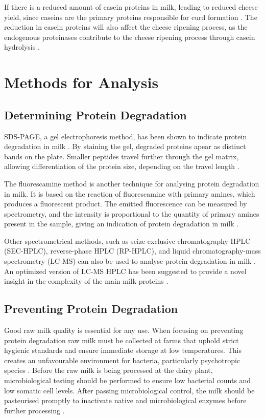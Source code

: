 If there is a reduced amount of casein proteins in milk, leading to reduced cheese yield, since caseins are the primary proteins responsible for curd formation \cite*{a02_proteases_and_protein_degradation}. The reduction in casein proteins will also affect the cheese ripening process, as the endogenous proteinases contribute to the cheese ripening process through casein hydrolysis \cite*{a02_proteases_and_protein_degradation}.


\section{Methods for Analysis}

\subsection{Determining Protein Degradation}
SDS-PAGE, a gel electrophoresis method, has been shown to indicate protein degradation in milk \cite*{a02_proteases_and_protein_degradation}. By staining the gel, degraded proteins apear as distinct bands on the plate. Smaller peptides travel further through the gel matrix, allowing differentiation of the protein size, depending on the travel length  \cite*{a02_proteases_and_protein_degradation}.

The fluorescamine method is another technique for analysing protein degradation in milk. It is based on the reaction of fluorescamine with primary amines, which produces a fluorescent product. The emitted fluorescence can be measured by spectrometry, and the intensity is proportional to the quantity of primary amines present in the sample, giving an indication of protein degradation in milk \cite*{a02_proteases_and_protein_degradation}.

Other spectrometrical methods, such as seize-exclusive chromatography HPLC (SEC-HPLC), reverse-phase HPLC (RP-HPLC), and liquid chromatography-mass spectrometry (LC-MS) can also be used to analyse protein degradation in milk \cite*{s07_hplc_milk_components,a09_proteomics}. An optimized version of LC-MS HPLC has been suggested to provide a novel insight in the complexity of the main milk proteins \cite*{a09_proteomics}.

\subsection{Preventing Protein Degradation}
Good raw milk quality is essential for any use. When focusing on preventing protein degradation raw milk must be collected at farms that uphold strict hygienic standards and ensure immediate storage at low temperatures. This creates an unfavourable environment for bacteria, particularly psychotropic species \cite*{a08_shelf_life_of_heat_treated_dairy_products}. Before the raw milk is being processed at the dairy plant, microbiological testing should be performed to ensure low bacterial counts and low somatic cell levels. After passing microbiological control, the milk should be pasteurised promptly to inactivate native and microbiological enzymes before further processing \cite*{a08_shelf_life_of_heat_treated_dairy_products}. 


